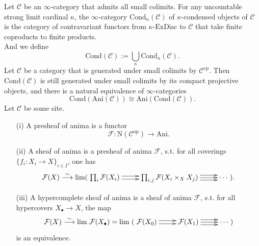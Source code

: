\documentclass[UTF8,12,a4paper]{ctexart}
\theoremstyle{definition}
\begin{document}
\dfn 
Let $\mathcal{C}$ be an $\infty$-category that admits all small colimits. For any uncountable strong limit cardinal $\kappa$, the $\infty$-category $\text{Cond}_\kappa (\mathcal{C})$ of $\kappa$-condensed objects of $\mathcal{C}$ is the category of contravariant functors from $\kappa\text{-ExDisc}$ to $\mathcal{C}$ that take finite coproducts to finite products.\\
And we define
$$
\text{Cond}(\mathcal{C}):=\bigcup_\kappa \text{Cond}_\kappa (\mathcal{C}).
$$
\prop 
Let $\mathcal{C}$ be a category that is generated under small colimits by $\mathcal{C}^\text{cp}$. Then $\text{Cond}(\mathcal{C})$ is still generated under small colimits by its compact projective objects, and there is a natural equivalence of $\infty$-categories
$$\text{Cond}(\text{Ani}(\mathcal{C}))\cong \text{Ani}(\text{Cond}(\mathcal{C})).$$
\newline
\dfn 
Let $\mathcal{C}$ be some site. 
\begin{itemize}
	\item [(i)]A presheaf of anima is a functor
	$$
	\mathcal{F}:\mathrm{N}(\mathcal{C}^\text{op})\longrightarrow \text{Ani}.
	$$
	\item [(ii)] A sheaf of anima is a presheaf of anima $	\mathcal{F}$, s.t. for all coverings $\{f_i:X_i\to X\}_{i\in I}$, one has
	$$
	\mathcal{F}(X)\stackrel{\sim}{\longrightarrow} 
	\text{lim} ( 
	\xymatrix{
	\prod_i \mathcal{F}(X_i) \ar@<0.5ex>[r]\ar@<-0.5ex>[r] &\prod_{i,j} \mathcal{F}(X_i\times_X X_j)\ar@<0.8ex>[r]\ar@<-0.8ex>[r]\ar[r]&\cdots
     }).
 	$$
 	\item [(iii)] A hypercomplete sheaf of anima is a sheaf of anima $\mathcal{F}$, s.t. for all hypercovers $X_\bullet\rightarrow X$, the map
 	$$
 	\mathcal{F}(X)\stackrel{\sim}{\longrightarrow}\text{lim}\ \mathcal{F}(X_\bullet)=\text{lim}\ (
 	\xymatrix{
 		 \mathcal{F}(X_0) \ar@<0.5ex>[r]\ar@<-0.5ex>[r] & \mathcal{F}(X_1)\ar@<0.8ex>[r]\ar@<-0.8ex>[r]\ar[r]&\cdots
 	}
 	)
 	$$
 	is an equivalence.
\end{itemize}
\end{document}
